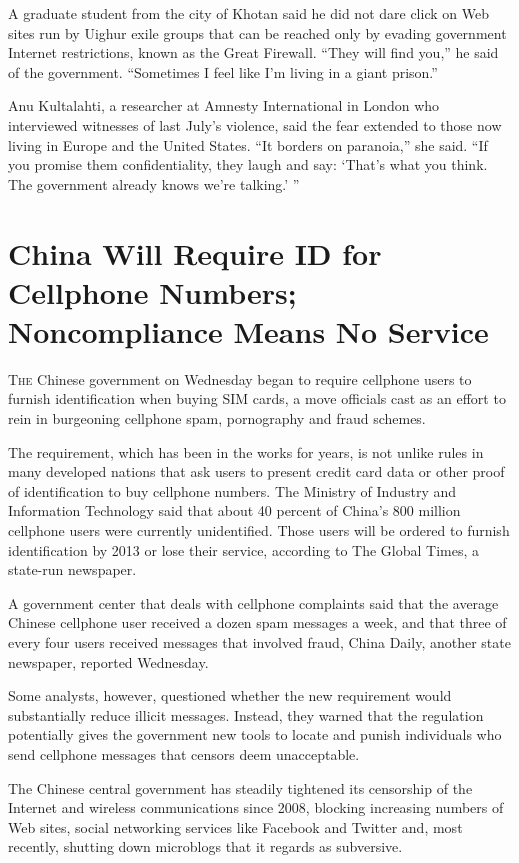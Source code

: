 ﻿\documentclass[12pt]{article}
\begin{document}
A graduate student from the city of Khotan said he did not dare click on Web sites run by Uighur
exile groups that can be reached only by evading government Internet restrictions, known as the
Great Firewall. ``They will find you,'' he said of the government. ``Sometimes I feel like I'm
living in a giant prison.''

Anu Kultalahti, a researcher at Amnesty International in London who interviewed witnesses of last
July's violence, said the fear extended to those now living in Europe and the United States. ``It
borders on paranoia,'' she said. ``If you promise them confidentiality, they laugh and say: `That's
what you think. The government already knows we're talking.' ''

\pagebreak
\section{China Will Require ID for Cellphone Numbers; Noncompliance Means No Service}

\lettrine{T}{he} Chinese government on Wednesday began to require cellphone
users to furnish identification when buying SIM cards, a move officials cast as an effort to rein in
burgeoning cellphone spam, pornography and fraud schemes.

The requirement, which has been in the works for years, is not unlike rules in many developed
nations that ask users to present credit card data or other proof of identification to buy cellphone
numbers. The Ministry of Industry and Information Technology said that about 40 percent of China's
800 million cellphone users were currently unidentified. Those users will be ordered to furnish
identification by 2013 or lose their service, according to The Global Times, a state-run newspaper.

A government center that deals with cellphone complaints said that the average Chinese cellphone
user received a dozen spam messages a week, and that three of every four users received messages
that involved fraud, China Daily, another state newspaper, reported Wednesday.

Some analysts, however, questioned whether the new requirement would substantially reduce illicit
messages. Instead, they warned that the regulation potentially gives the government new tools to
locate and punish individuals who send cellphone messages that censors deem unacceptable.

The Chinese central government has steadily tightened its censorship of the Internet and wireless
communications since 2008, blocking increasing numbers of Web sites, social networking services like
Facebook and Twitter and, most recently, shutting down microblogs that it regards as subversive.
\end{document}
